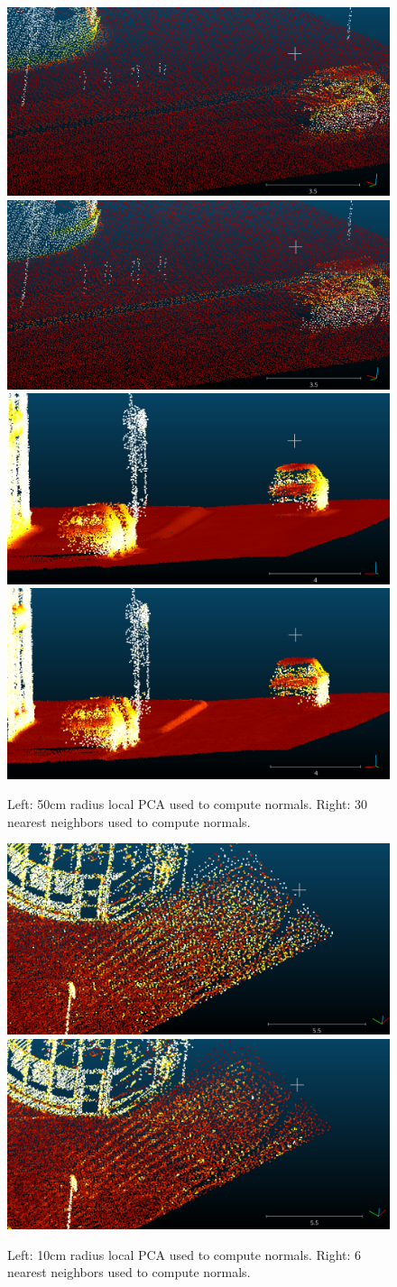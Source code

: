 \documentclass[a4paper]{article}
\begin{document}
\begin{figure}[ht]
  \centering
  \includegraphics[width=0.46\linewidth]{figures/cc_normals_PCA_r=50cm_smooth.png}
  \includegraphics[width=0.46\linewidth]{figures/cc_normals_PCA_50cm_k=30_nearest.png}
  \includegraphics[width=0.46\linewidth]{figures/cc_normals_PCA_r=50cm_v2.png}
  \includegraphics[width=0.46\linewidth]{figures/cc_normals_PCA_50cm_k=30_v2.png}
  \caption{Left: 50cm radius local PCA used to compute normals. 
  Right: 30 nearest neighbors used to compute normals.} 
  \label{fig:local_PCA_neighbor}
\end{figure}




\begin{figure}[ht]
  \centering
  \includegraphics[width=0.46\linewidth]{figures/zoom_r=0_1.png}
  \includegraphics[width=0.46\linewidth]{figures/zoom_k=6.png}
  \caption{Left: 10cm radius local PCA used to compute normals. 
  Right: 6 nearest neighbors used to compute normals.} 
  \label{fig:local_PCA_neighbor_zoom}
\end{figure}
\end{document}
